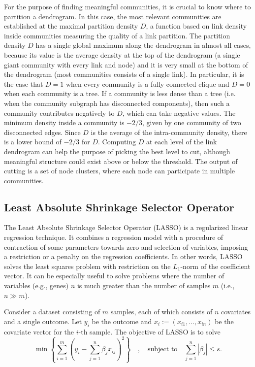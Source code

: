 \documentclass{bmcart}
\newcommand{\abs}[1]{\left\vert#1\right\vert}
\begin{document}
For the purpose of finding meaningful communities, it is crucial to
know where to partition a dendrogram. In this case, the most
relevant communities are established at the maximal partition density
$D$, a function based on link density inside communities measuring the
quality of a link partition. The partition density $D$ has a single
global maximum along the dendrogram in almost all cases, because its
value is the average density at the top of the dendrogram (a single
giant community with every link and node) and it is very small at the
bottom of the dendrogram (most communities consists of a single
link). In particular, it is the case that $D = 1$ when every community
is a fully connected clique and $D = 0$ when each community is a
tree. If a community is less dense than a tree (i.e. when the
community subgraph has disconnected components), then such a community
contributes negatively to $D$, which can take negative values. The
minimum density inside a community is $-2/3$, given by one community
of two disconnected edges. Since $D$ is the average of the
intra-community density, there is a lower bound of $-2/3$ for
$D$. Computing $D$ at each level of the link dendrogram can help the
purpose of picking the best level to cut, although meaningful
structure could exist above or below the threshold. The output of
cutting is a set of node clusters, where each node can participate in
multiple communities.

\subsection*{Least Absolute Shrinkage Selector Operator}

The Least Absolute Shrinkage Selector Operator (LASSO) is a
regularized linear regression technique. It combines a regression
model with a procedure of contraction of some parameters towards zero
and selection of variables, imposing a restriction or a penalty on the
regression coefficients. In other words, LASSO solves the least
squares problem with restriction on the $ L_1$-norm of the coefficient
vector. It can be especially useful to solve problems where the number
of variables (e.g., genes) $ n $ is much greater than the number of
samples $ m $ (i.e., $ n \gg m $).
\vspace{0.5cm}

Consider a dataset consisting of $m$ samples, each of which consists
of $n$ covariates and a single outcome. Let $y_i$ be the outcome and
$x_i := (x_{i1},...,x_{in})$ be the covariate vector for the $i$-th
sample. The objective of LASSO is to solve
%
\begin{equation}
\min \left\lbrace\sum_{i=1}^{m}{\left( y_i-\sum_{j=1}^n{\beta_j
    x_{ij}}\right)^2} \right\rbrace \quad , \quad \textrm{subject to}
\quad \sum_{j=1}^n\abs{\beta_j}\leq s.
\end{equation}
\end{document}
